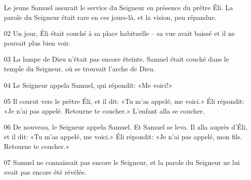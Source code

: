 Le jeune Samuel assurait le service du Seigneur en présence du prêtre Éli. La parole du Seigneur était rare en ces jours-là, et la vision, peu répandue.

02 Un jour, Éli était couché à sa place habituelle – sa vue avait baissé et il ne pouvait plus bien voir.

03 La lampe de Dieu n’était pas encore éteinte. Samuel était couché dans le temple du Seigneur, où se trouvait l’arche de Dieu.

04 Le Seigneur appela Samuel, qui répondit: «Me voici!»

05 Il courut vers le prêtre Éli, et il dit: «Tu m’as appelé, me voici.» Éli répondit: «Je n’ai pas appelé. Retourne te coucher.» L’enfant alla se coucher.

06 De nouveau, le Seigneur appela Samuel. Et Samuel se leva. Il alla auprès d’Éli, et il dit: «Tu m’as appelé, me voici.» Éli répondit: «Je n’ai pas appelé, mon fils. Retourne te coucher.»

07 Samuel ne connaissait pas encore le Seigneur, et la parole du Seigneur ne lui avait pas encore été révélée.
